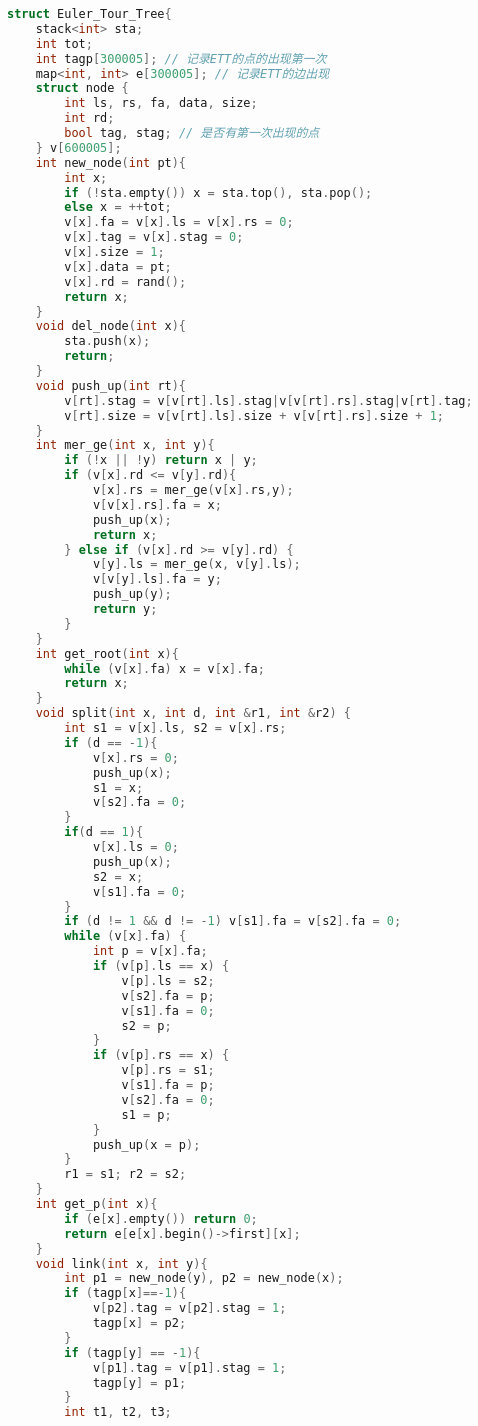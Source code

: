 \begin{lstlisting}[language=C++]
struct Euler_Tour_Tree{
    stack<int> sta;
    int tot;
    int tagp[300005]; // 记录ETT的点的出现第一次
    map<int, int> e[300005]; // 记录ETT的边出现
    struct node {
        int ls, rs, fa, data, size;
        int rd;
        bool tag, stag; // 是否有第一次出现的点
    } v[600005];
    int new_node(int pt){
        int x;
        if (!sta.empty()) x = sta.top(), sta.pop();
        else x = ++tot;
        v[x].fa = v[x].ls = v[x].rs = 0;
        v[x].tag = v[x].stag = 0;
        v[x].size = 1;
        v[x].data = pt;
        v[x].rd = rand();
        return x;
    }
    void del_node(int x){
        sta.push(x);
        return;
    }
    void push_up(int rt){
        v[rt].stag = v[v[rt].ls].stag|v[v[rt].rs].stag|v[rt].tag;
        v[rt].size = v[v[rt].ls].size + v[v[rt].rs].size + 1;
    }
    int mer_ge(int x, int y){
        if (!x || !y) return x | y;
        if (v[x].rd <= v[y].rd){
            v[x].rs = mer_ge(v[x].rs,y);
            v[v[x].rs].fa = x;
            push_up(x);
            return x;
        } else if (v[x].rd >= v[y].rd) {
            v[y].ls = mer_ge(x, v[y].ls);
            v[v[y].ls].fa = y;
            push_up(y);
            return y;
        }
    }
    int get_root(int x){
        while (v[x].fa) x = v[x].fa;
        return x;
    }
    void split(int x, int d, int &r1, int &r2) {
        int s1 = v[x].ls, s2 = v[x].rs;
        if (d == -1){
            v[x].rs = 0;
            push_up(x);
            s1 = x;
            v[s2].fa = 0;
        }
        if(d == 1){
            v[x].ls = 0;
            push_up(x);
            s2 = x;
            v[s1].fa = 0;
        }
        if (d != 1 && d != -1) v[s1].fa = v[s2].fa = 0;
        while (v[x].fa) {
            int p = v[x].fa;
            if (v[p].ls == x) {
                v[p].ls = s2;
                v[s2].fa = p;
                v[s1].fa = 0;
                s2 = p;
            }
            if (v[p].rs == x) {
                v[p].rs = s1;
                v[s1].fa = p;
                v[s2].fa = 0;
                s1 = p;
            }
            push_up(x = p);
        }
        r1 = s1; r2 = s2;
    }
    int get_p(int x){
        if (e[x].empty()) return 0;
        return e[e[x].begin()->first][x];
    }
    void link(int x, int y){
        int p1 = new_node(y), p2 = new_node(x);
        if (tagp[x]==-1){
            v[p2].tag = v[p2].stag = 1;
            tagp[x] = p2;
        }
        if (tagp[y] == -1){
            v[p1].tag = v[p1].stag = 1;
            tagp[y] = p1;
        }
        int t1, t2, t3;

\end{lstlisting}
